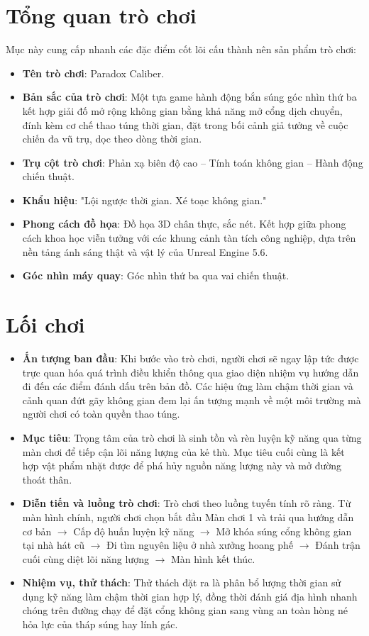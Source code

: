 \documentclass[../DoAn.tex]{subfiles}
\begin{document}
\section{Tổng quan trò chơi}
Mục này cung cấp nhanh các đặc điểm cốt lõi cấu thành nên sản phẩm trò chơi:
\begin{itemize}
    \item \textbf{Tên trò chơi}: Paradox Caliber.
    \item \textbf{Bản sắc của trò chơi}: Một tựa game hành động bắn súng góc nhìn thứ ba kết hợp giải đố mở rộng không gian bằng khả năng mở cổng dịch chuyển, đính kèm cơ chế thao túng thời gian, đặt trong bối cảnh giả tưởng về cuộc chiến đa vũ trụ, dọc theo dòng thời gian.
    \item \textbf{Trụ cột trò chơi}: Phản xạ biên độ cao -- Tính toán không gian -- Hành động chiến thuật.
    \item \textbf{Khẩu hiệu}: "Lội ngược thời gian. Xé toạc không gian."
    \item \textbf{Phong cách đồ họa}: Đồ họa 3D chân thực, sắc nét. Kết hợp giữa phong cách khoa học viễn tưởng với các khung cảnh tàn tích công nghiệp, dựa trên nền tảng ánh sáng thật và vật lý của Unreal Engine 5.6.
    \item \textbf{Góc nhìn máy quay}: Góc nhìn thứ ba qua vai chiến thuật.
\end{itemize}

\section{Lối chơi}
\begin{itemize}
    \item \textbf{Ấn tượng ban đầu}: Khi bước vào trò chơi, người chơi sẽ ngay lập tức được trực quan hóa quá trình điều khiển thông qua giao diện nhiệm vụ hướng dẫn đi đến các điểm đánh dấu trên bản đồ. Các hiệu ứng làm chậm thời gian và cảnh quan đứt gãy không gian đem lại ấn tượng mạnh về một môi trường mà người chơi có toàn quyền thao túng.
    \item \textbf{Mục tiêu}: Trọng tâm của trò chơi là sinh tồn và rèn luyện kỹ năng qua từng màn chơi để tiếp cận lõi năng lượng của kẻ thù. Mục tiêu cuối cùng là kết hợp vật phẩm nhặt được để phá hủy nguồn năng lượng này và mở đường thoát thân.
    \item \textbf{Diễn tiến và luồng trò chơi}: Trò chơi theo luồng tuyến tính rõ ràng. Từ màn hình chính, người chơi chọn bắt đầu Màn chơi 1 và trải qua hướng dẫn cơ bản \(\rightarrow\) Cấp độ huấn luyện kỹ năng \(\rightarrow\) Mở khóa súng cổng không gian tại nhà hát cũ \(\rightarrow\) Đi tìm nguyên liệu ở nhà xưởng hoang phế \(\rightarrow\) Đánh trận cuối cùng diệt lõi năng lượng \(\rightarrow\) Màn hình kết thúc.
    \item \textbf{Nhiệm vụ, thử thách}: Thử thách đặt ra là phân bổ lượng thời gian sử dụng kỹ năng làm chậm thời gian hợp lý, đồng thời đánh giá địa hình nhanh chóng trên đường chạy để đặt cổng không gian sang vùng an toàn hòng né hỏa lực của tháp súng hay lính gác.
\end{itemize}
\end{document}
